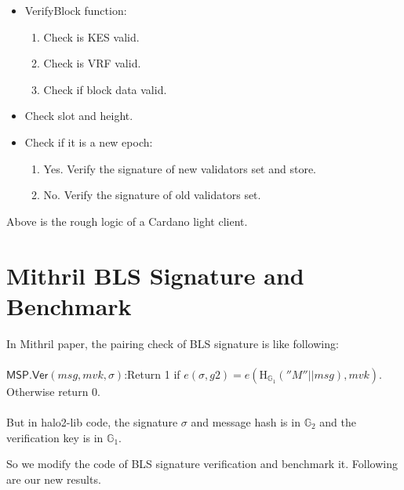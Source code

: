 \documentclass{article}
\begin{document}
\begin{itemize}
    \item VerifyBlock function:
        \begin{enumerate}
            \item Check is KES valid.
            \item Check is VRF valid.
            \item Check if block data valid.
        \end{enumerate}
    \item Check slot and height.
    \item Check if it is a new epoch:
        \begin{enumerate}
            \item Yes. Verify the signature of new validators set and store.
            \item No. Verify the signature of old validators set.
        \end{enumerate}
\end{itemize}

Above is the rough logic of a Cardano light client.


\section{Mithril BLS Signature and Benchmark}

In Mithril paper, the pairing check of BLS signature is like following:
\\
\\
$\mathsf{MSP.Ver}(msg, mvk, \sigma)$:Return 1 if $ e(\sigma, g2) = e(\textrm{H}_{\mathbb{G}_1}
(''M''||msg), mvk).$ Otherwise return 0.
\\
\\
But in halo2-lib code, the signature $\sigma$ and message hash is in $\mathbb{G}_2$ and the verification key is in $\mathbb{G}_1$.

So we modify the code of BLS signature verification and benchmark it.
Following are our new results.
\end{document}
